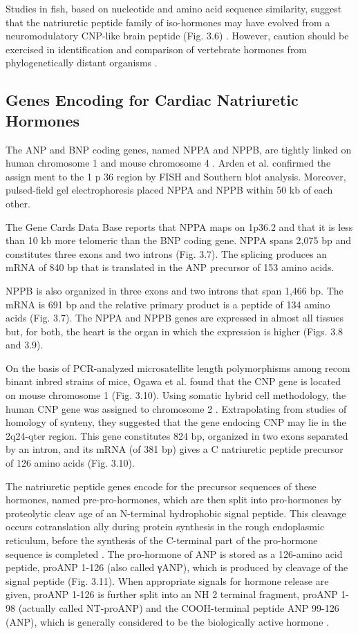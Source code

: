 \documentclass[14pt,a4paper,onecolumn]{extarticle}
\begin{document}
Studies in fish, based on nucleotide and amino acid sequence similarity, suggest that the natriuretic peptide family of iso-hormones may have evolved from a neuromodulatory CNP-like brain peptide (Fig. 3.6) \citep{4}. However, caution should be exercised in identification and comparison of vertebrate hormones from phylogenetically distant organisms \citep{1}.

\subsection{Genes Encoding for Cardiac Natriuretic Hormones
}
The ANP and BNP coding genes, named NPPA and NPPB, are tightly linked on human chromosome 1 and mouse chromosome 4 \citep{7}\citep{8}. Arden et al. \citep{7} confirmed the assign ment to the 1 p 36 region by FISH and Southern blot analysis. Moreover, pulsed-field gel electrophoresis placed NPPA and NPPB within 50 kb of each other.

The Gene Cards Data Base reports that NPPA maps on 1p36.2 and that it is less than 10 kb more telomeric than the BNP coding gene. NPPA spans 2,075 bp and constitutes three exons and two introns (Fig. 3.7). The splicing produces an mRNA of 840 bp that is translated in the ANP precursor of 153 amino acids.

NPPB is also organized in three exons and two introns that span 1,466 bp. The mRNA is 691 bp and the relative primary product is a peptide of 134 amino acids (Fig. 3.7).  The NPPA and NPPB genes are expressed in almost all tissues but, for both, the heart is the organ in which the expression is higher (Figs. 3.8 and 3.9).

On the basis of PCR-analyzed microsatellite length polymorphisms among recom binant inbred strains of mice, Ogawa et al. \citep{10} found that the CNP gene is located on mouse chromosome 1 (Fig. 3.10). Using somatic hybrid cell methodology, the human CNP gene was assigned to chromosome 2 \citep{10}. Extrapolating from studies of homology of synteny, they suggested that the gene endocing CNP may lie in the 2q24-qter region.  This gene constitutes 824 bp, organized in two exons separated by an intron, and its mRNA (of 381 bp) gives a C natriuretic peptide precursor of 126 amino acids (Fig. 3.10).

The natriuretic peptide genes encode for the precursor sequences of these hormones, named pre-pro-hormones, which are then split into pro-hormones by proteolytic cleav age of an N-terminal hydrophobic signal peptide. This cleavage occurs cotranslation ally during protein synthesis in the rough endoplasmic reticulum, before the synthesis of the C-terminal part of the pro-hormone sequence is completed \citep{11-13}.  The pro-hormone of ANP is stored as a 126-amino acid peptide, proANP 1-126 (also called γANP), which is produced by cleavage of the signal peptide (Fig. 3.11). When appropriate signals for hormone release are given, proANP 1-126 is further split into an NH 2 terminal fragment, proANP 1-98 (actually called NT-proANP) and the COOH-terminal peptide ANP 99-126 (ANP), which is generally considered to be the biologically active hormone \citep{11-13}.
\end{document}

